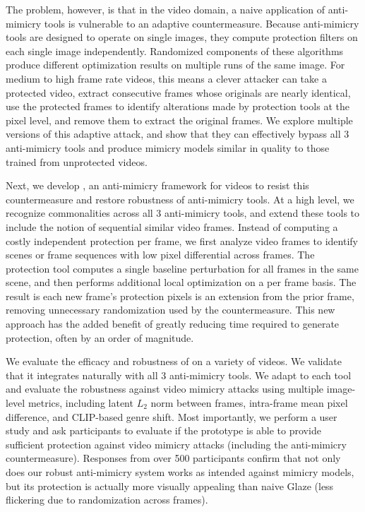 The problem, however, is that in the video domain, a naive application of
anti-mimicry tools is vulnerable to an adaptive countermeasure. Because
anti-mimicry tools are designed to operate on single images, they compute
protection filters on each single image independently. Randomized components
of these algorithms produce different optimization results on multiple runs
of the same image. For medium to high frame rate videos, this means a clever
attacker can take a protected video, extract consecutive frames whose originals are nearly identical, use the protected frames to identify alterations made by protection tools at the pixel level, and remove them to extract the original frames.  We explore multiple versions of this adaptive attack, and show that they can effectively bypass all 3 anti-mimicry tools and produce mimicry models similar in quality to those trained from
unprotected videos.

Next, we develop \system{}, an anti-mimicry framework for videos to resist this
countermeasure and restore robustness of anti-mimicry tools. At a high level,
we recognize commonalities across all 3 anti-mimicry tools, and extend these
tools to include the notion of sequential similar video frames. Instead of
computing a costly independent protection per frame, we first analyze video
frames to identify scenes or frame sequences with low pixel differential
across frames. The protection tool computes a single baseline perturbation
for all frames in the same scene, and then performs additional local
optimization on a per frame basis. The result is each new frame's protection
pixels is an extension from the prior frame, removing unnecessary
randomization used by the countermeasure. This new approach has the added
benefit of greatly reducing time required to generate protection, often by an
order of magnitude.

We evaluate the efficacy and robustness of \system{} on a variety of
videos. We validate that it integrates naturally with all 3 anti-mimicry
tools. We adapt \system{} to each tool and evaluate the robustness against
video mimicry attacks using multiple image-level metrics, including latent
$L_2$ norm between frames, intra-frame mean 
pixel difference, and CLIP-based genre shift.
Most importantly, we perform a
user study and ask participants to evaluate if the prototype is able to
provide sufficient protection against video mimicry attacks (including the
anti-mimicry countermeasure).  Responses from over 500 participants confirm that
not only does our robust anti-mimicry system works as intended against
mimicry models, but its protection is actually more visually appealing than
naive Glaze (less flickering due to randomization across frames).

